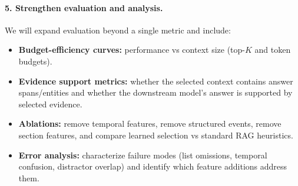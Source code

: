 \paragraph{5. Strengthen evaluation and analysis.}
We will expand evaluation beyond a single metric and include:
\begin{itemize}
    \item \textbf{Budget-efficiency curves:} performance vs context size (top-$K$ and token budgets).
    \item \textbf{Evidence support metrics:} whether the selected context contains answer spans/entities and whether the downstream model's answer is supported by selected evidence.
    \item \textbf{Ablations:} remove temporal features, remove structured events, remove section features, and compare learned selection vs standard RAG heuristics.
    \item \textbf{Error analysis:} characterize failure modes (list omissions, temporal confusion, distractor overlap) and identify which feature additions address them.
\end{itemize}